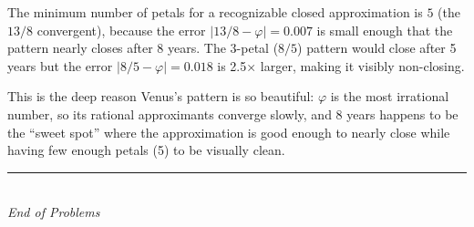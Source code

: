 \documentclass[11pt,letterpaper]{article}
\begin{document}
\begin{challengesolution}
The minimum number of petals for a recognizable closed approximation
is $\boxed{5}$ (the $13/8$ convergent), because the error
$|13/8 - \varphi| = 0.007$ is small enough that the pattern
nearly closes after 8 years. The 3-petal ($8/5$) pattern
would close after 5 years but the error $|8/5 - \varphi| = 0.018$
is 2.5× larger, making it visibly non-closing.

This is the deep reason Venus's pattern is so beautiful: $\varphi$
is the most irrational number, so its rational approximants converge
slowly, and 8 years happens to be the ``sweet spot'' where the
approximation is good enough to nearly close while having few
enough petals (5) to be visually clean.
\end{challengesolution}

\vspace{1cm}
\begin{center}
\rule{0.5\textwidth}{0.4pt}\\[6pt]
{\large\itshape End of Problems}
\end{center}
\end{document}
